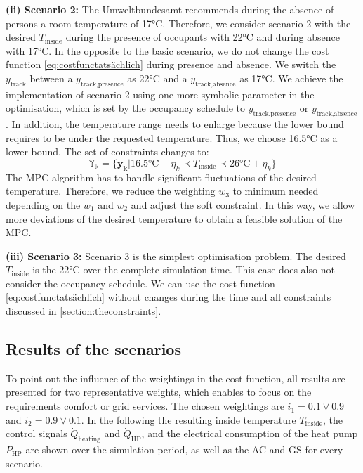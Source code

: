 \textbf{(ii) Scenario 2:}\newline
The Umweltbundesamt \cite{Umweltbundesamt.7.10.2021} recommends during the absence of persons a room temperature of 17°C. Therefore, we consider scenario 2 with the desired $T_\text{inside}$ during the presence of occupants with 22°C and during absence with 17°C. In the opposite to the basic scenario, we do not change the cost function \ref{eq:costfunctatsächlich} during presence and absence. We switch the $y_\text{track}$ between a $y_\text{track,presence}$ as 22°C and a $y_\text{track,absence}$ as 17°C. We achieve the implementation of scenario 2 using one more symbolic parameter in the optimisation, which is set by the occupancy schedule to $y_\text{track,presence}$ or $y_\text{track,absence}$. In addition, the temperature range needs to enlarge because the lower bound requires to be under the requested temperature. Thus, we choose 16.5°C as a lower bound. The set of constraints changes to:
\begin{equation}
    \label{ConstraintYScenario2}
    \mathbb{Y_k} = \{\mathbf{y_k}| 16.5 \text{°C} - \eta_k \prec T_\text{inside} \prec 26 \text{°C}+ \eta_k\} 
\end{equation}
The MPC algorithm has to handle significant fluctuations of the desired temperature. Therefore, we reduce the weighting $w_\text{3}$ to minimum needed depending on the $w_\text{1}$ and $w_\text{2}$ and adjust the soft constraint. In this way, we allow more deviations of the desired temperature to obtain a feasible solution of the MPC. \newline 

\textbf{(iii) Scenario 3:}\newline
Scenario 3 is the simplest optimisation problem. The desired $T_\text{inside}$ is the 22°C over the complete simulation time. This case does also not consider the occupancy schedule. We can use the cost function \ref{eq:costfunctatsächlich} without changes during the time and all constraints discussed in \autoref{section:theconstraints}.

\subsection{Results of the scenarios}
\label{subsec:Results of the scenarios}
To point out the influence of the weightings in the cost function, all results are presented for two representative weights, which enables to focus on the requirements comfort or grid services. The chosen weightings are $i_\text{1} = 0.1 \vee 0.9$ and $i_\text{2} = 0.9 \vee 0.1$. In the following the resulting inside temperature $T_\text{inside}$, the control signals  $\dot{Q}_\text{heating}$ and $\dot{Q}_\text{HP}$, and the electrical consumption of the heat pump $P_\text{HP}$ are shown over the simulation period, as well as the AC and GS for every scenario.\newline


